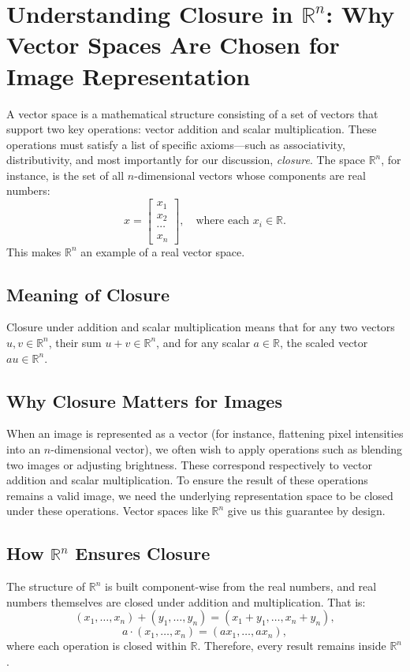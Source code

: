 \section{Understanding Closure in \(\mathbb{R}^n\): Why Vector Spaces Are Chosen for Image Representation}

A vector space is a mathematical structure consisting of a set of  vectors that support two key operations: vector addition and scalar multiplication. These operations must satisfy a list of specific axioms—such as associativity, distributivity, and most importantly for our discussion, \emph{closure}. The space \(\mathbb{R}^n\), for instance, is the set of all \(n\)-dimensional vectors whose components are real numbers:
\[
x = \begin{bmatrix} x_1 \\ x_2 \\ \cdots \\ x_n \end{bmatrix}, \quad \text{where each } x_i \in \mathbb{R}.
\]
This makes \(\mathbb{R}^n\) an example of a real vector space.

\subsection{Meaning of Closure}
Closure under addition and scalar multiplication means that for any two vectors \( u, v \in \mathbb{R}^n \), their sum \( u + v \in \mathbb{R}^n \), and for any scalar \( a \in \mathbb{R} \), the scaled vector \( a u \in \mathbb{R}^n \). 

\subsection{Why Closure Matters for Images}
When an image is represented as a vector (for instance, flattening pixel intensities into an \(n\)-dimensional vector), we often wish to apply operations such as blending two images or adjusting brightness. These correspond respectively to vector addition and scalar multiplication. To ensure the result of these operations remains a valid image, we need the underlying representation space to be closed under these operations. Vector spaces like \(\mathbb{R}^n\) give us this guarantee by design.

\subsection{How \(\mathbb{R}^n\) Ensures Closure}
The structure of \(\mathbb{R}^n\) is built component-wise from the real numbers, and real numbers themselves are closed under addition and multiplication. That is:
\[
(x_1, \dots, x_n) + (y_1, \dots, y_n) = (x_1 + y_1, \dots, x_n + y_n),
\]
\[
a \cdot (x_1, \dots, x_n) = (a x_1, \dots, a x_n),
\]
where each operation is closed within \(\mathbb{R}\). Therefore, every result remains inside \(\mathbb{R}^n\).

